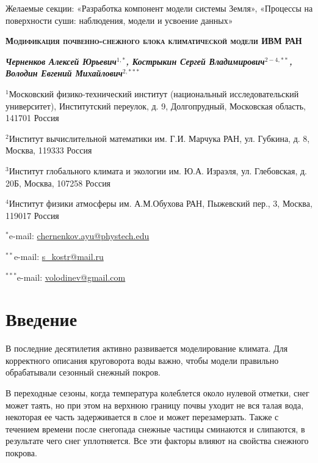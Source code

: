 \documentclass[a4paper, fontsize=12pt]{scrartcl}
\begin{document}
\begin{raggedright}
Желаемые секции: «Разработка компонент модели системы Земля», «Процессы на поверхности суши: наблюдения, модели и усвоение данных»
\end{raggedright}


\begin{center}
    \Large
    \textbf{\textsc{Модификация почвенно-снежного блока климатической модели ИВМ РАН}}
    \normalsize 
    
    \textbf{\textit{Черненков Алексей Юрьевич$^{1, *}$, Кострыкин Сергей Владимирович$^{2-4, **}$, Володин Евгений Михайлович$^{2, ***}$}}
    
            $^1$Московский физико-технический институт (национальный исследовательский университет), Институтский переулок, д. 9, Долгопрудный, Московская область, 141701 Россия
    
            $^2$Институт вычислительной математики им. Г.И. Марчука РАН, ул. Губкина, д. 8, Москва, 119333 Россия
    
            $^3$Институт глобального климата и экологии им. Ю.А. Израэля, ул. Глебовская, д. 20Б, Москва, 107258 Россия
    
            $^4$Институт физики атмосферы им. А.М.Обухова РАН, Пыжевский пер., 3, Москва, 119017 Россия
    
            $^*$e-mail: \url{chernenkov.ayu@phystech.edu}
    
            $^{**}$e-mail: \url{s_kostr@mail.ru}
            
            $^{***}$e-mail: \url{volodinev@gmail.com}
    
\end{center}







\section{Введение}

В последние десятилетия активно развивается моделирование климата. Для корректного описания круговорота воды важно, чтобы модели правильно обрабатывали сезонный снежный покров.

В переходные сезоны, когда температура колеблется около нулевой отметки, снег может таять, но при этом на верхнюю границу почвы уходит не вся талая вода, некоторая ее часть задерживается в слое и может перезамерзать. Также с течением времени после снегопада снежные частицы сминаются и слипаются, в результате чего снег уплотняется. Все эти факторы влияют на свойства снежного покрова. 
\end{document}
